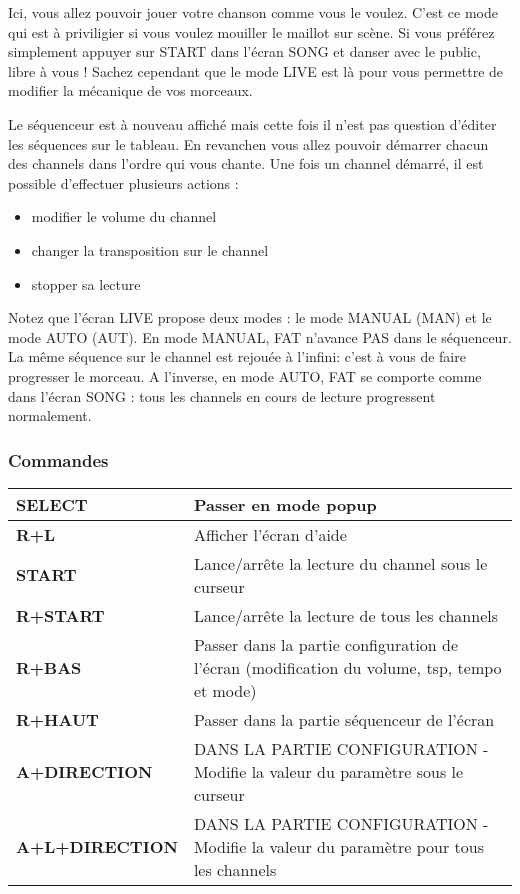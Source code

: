 Ici, vous allez pouvoir jouer votre chanson comme vous le voulez.
C'est ce mode qui est à priviligier si vous voulez mouiller le maillot sur scène.
Si vous préférez simplement appuyer sur START dans l'écran SONG et danser avec le public, libre à vous !
Sachez cependant que le mode LIVE est là pour vous permettre de modifier la mécanique de vos morceaux.


Le séquenceur est à nouveau affiché mais cette fois il n'est pas question d'éditer les séquences sur le tableau.
En revanchen vous allez pouvoir démarrer chacun des channels dans l'ordre qui vous chante.
Une fois un channel démarré, il est possible d'effectuer plusieurs actions :
\medskip

\begin{itemize}
    \item{modifier le volume du channel}
    \item{changer la transposition sur le channel}
    \item{stopper sa lecture}
\end{itemize}
\medskip

Notez que l'écran LIVE propose deux modes : le mode MANUAL (MAN) et le mode AUTO (AUT).
En mode MANUAL, FAT n'avance PAS dans le séquenceur. La même séquence sur le channel est rejouée à l'infini: c'est à vous de faire progresser le morceau.
A l'inverse, en mode AUTO, FAT se comporte comme dans l'écran SONG : tous les channels en cours de lecture progressent normalement.
\newpage %
\subsubsection{Commandes}
\begin{supertabular}{|l|p{10cm}|}
    \hline
    {\bf SELECT} & Passer en mode popup \\
    \hline
    {\bf R+L} & Afficher l'écran d'aide \\
    \hline
    {\bf START} & Lance/arrête la lecture du channel sous le curseur \\
    \hline
    {\bf R+START} & Lance/arrête la lecture de tous les channels \\
    \hline
    {\bf R+BAS} & Passer dans la partie configuration de l'écran (modification du volume, tsp, tempo et mode) \\
    \hline
    {\bf R+HAUT} & Passer dans la partie séquenceur de l'écran \\
    \hline
    {\bf A+DIRECTION} & DANS LA PARTIE CONFIGURATION - Modifie la valeur du paramètre sous le curseur \\
    \hline
    {\bf A+L+DIRECTION} & DANS LA PARTIE CONFIGURATION - Modifie la valeur du paramètre pour tous les channels \\
    \hline
\end{supertabular}

